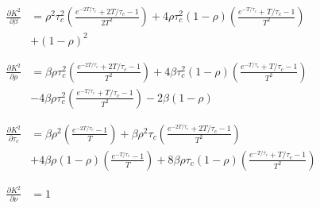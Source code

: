 \begin{align*}
    \label{eq:mesi_jacobian}
    \frac{\partial K^2}{\partial \beta}
    &= \rho^2\tau_c^2\left(\frac{e^{-2T/\tau_c} + 2T/\tau_c - 1}{2T^2}\right)
    + 4\rho\tau_c^2(1 - \rho)\left(\frac{e^{-T/\tau_c} + T/\tau_c - 1}{T^2}\right) \\
    &+ (1 - \rho)^2
    \\
    \\
    \\
    \frac{\partial K^2}{\partial \rho}
    &= \beta\rho\tau_c^2\left(\frac{e^{-2T/\tau_c} + 2T/\tau_c - 1}{T^2}\right)
    + 4\beta\tau_c^2(1 - \rho)\left(\frac{e^{-T/\tau_c} + T/\tau_c - 1}{T^2}\right) \\
    &- 4\beta\rho\tau_c^2\left(\frac{e^{-T/\tau_c} + T/\tau_c - 1}{T^2}\right)
    - 2\beta(1 - \rho)
    \\
    \\
    \\
    \frac{\partial K^2}{\partial \tau_c}
    &= \beta\rho^2\left(\frac{e^{-2T/\tau_c} - 1}{T}\right)
    + \beta\rho^2\tau_c\left(\frac{e^{-2T/\tau_c} + 2T/\tau_c - 1}{T^2}\right) \\
    &+ 4\beta\rho(1 - \rho)\left(\frac{e^{-T/\tau_c} - 1}{T}\right)
    + 8\beta\rho\tau_c(1 - \rho)\left(\frac{e^{-T/\tau_c} + T/\tau_c - 1}{T^2}\right)
    \\
    \\
    \\
    \frac{\partial K^2}{\partial \nu} &= 1
\end{align*}

%



